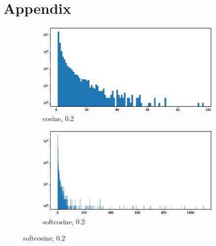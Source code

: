 \documentclass[a4paper,man,natbib,floatsintext,mask]{apa6}
\begin{document}


\clearpage

\section{Appendix}

\setcounter{figure}{0}
\renewcommand{\thefigure}{A\arabic{figure}}


\setcounter{table}{0}
\renewcommand{\thetable}{A\arabic{table}}




\begin{figure}[h!]
\captionsetup[subfigure]{justification=centering}
\begin{subfigure}{.5\textwidth}
  \centering
  \includegraphics[width=.8\linewidth]{figures/infomapcos02.eps}  
  \caption{cosine, 0.2}
  \label{fig:sub-infomapcos02}
\end{subfigure}
\begin{subfigure}{.5\textwidth}
  \centering
  \includegraphics[width=.8\linewidth]{figures/infomapsoft02.eps}  
  \caption{softcosine, 0.2}
  \label{fig:sub-infomapsoftcos02}
\end{subfigure}


\end{figure}
\end{document}
